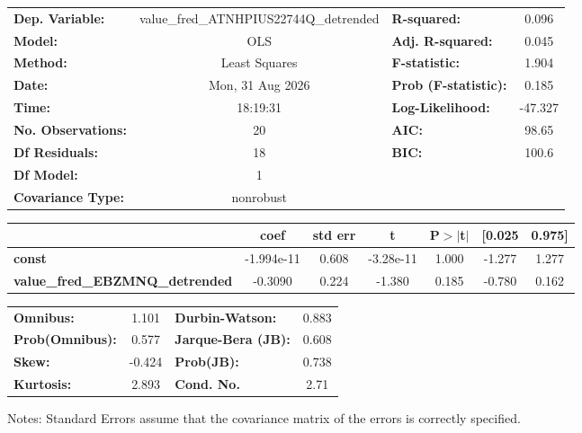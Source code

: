 \begin{center}
\begin{tabular}{lclc}
\toprule
\textbf{Dep. Variable:}                 & value\_fred\_ATNHPIUS22744Q\_detrended & \textbf{  R-squared:         } &     0.096   \\
\textbf{Model:}                         &                  OLS                   & \textbf{  Adj. R-squared:    } &     0.045   \\
\textbf{Method:}                        &             Least Squares              & \textbf{  F-statistic:       } &     1.904   \\
\textbf{Date:}                          &            Mon, 31 Aug 2026            & \textbf{  Prob (F-statistic):} &    0.185    \\
\textbf{Time:}                          &                18:19:31                & \textbf{  Log-Likelihood:    } &   -47.327   \\
\textbf{No. Observations:}              &                     20                 & \textbf{  AIC:               } &     98.65   \\
\textbf{Df Residuals:}                  &                     18                 & \textbf{  BIC:               } &     100.6   \\
\textbf{Df Model:}                      &                      1                 & \textbf{                     } &             \\
\textbf{Covariance Type:}               &               nonrobust                & \textbf{                     } &             \\
\bottomrule
\end{tabular}
\begin{tabular}{lcccccc}
                                        & \textbf{coef} & \textbf{std err} & \textbf{t} & \textbf{P$> |$t$|$} & \textbf{[0.025} & \textbf{0.975]}  \\
\midrule
\textbf{const}                          &   -1.994e-11  &        0.608     & -3.28e-11  &         1.000        &       -1.277    &        1.277     \\
\textbf{value\_fred\_EBZMNQ\_detrended} &      -0.3090  &        0.224     &    -1.380  &         0.185        &       -0.780    &        0.162     \\
\bottomrule
\end{tabular}
\begin{tabular}{lclc}
\textbf{Omnibus:}       &  1.101 & \textbf{  Durbin-Watson:     } &    0.883  \\
\textbf{Prob(Omnibus):} &  0.577 & \textbf{  Jarque-Bera (JB):  } &    0.608  \\
\textbf{Skew:}          & -0.424 & \textbf{  Prob(JB):          } &    0.738  \\
\textbf{Kurtosis:}      &  2.893 & \textbf{  Cond. No.          } &     2.71  \\
\bottomrule
\end{tabular}
\end{center}

Notes: \newline
 [1] Standard Errors assume that the covariance matrix of the errors is correctly specified.